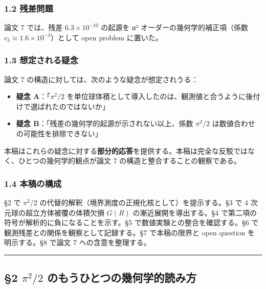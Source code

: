 \documentclass[
]{article}
\providecommand{\tightlist}{%
  \setlength{\itemsep}{0pt}\setlength{\parskip}{0pt}}
\begin{document}
\subsubsection{1.2 残差問題}\label{ux6b8bux5deeux554fux984c}

論文 7 では、残差 \(6.3 \times 10^{-10}\) の起源を α³
オーダーの幾何学的補正項（係数
\(c_3 \approx 1.6 \times 10^{-3}\)）として open problem に置いた。

\subsubsection{1.3
想定される疑念}\label{ux60f3ux5b9aux3055ux308cux308bux7591ux5ff5}

論文 7 の構造に対しては、次のような疑念が想定されうる：

\begin{itemize}
\tightlist
\item
  \textbf{疑念 A}：「\(\pi^2/2\)
  を単位球体積として導入したのは、観測値と合うように後付けで選ばれたのではないか」
\item
  \textbf{疑念 B}：「残差の幾何学的起源が示されない以上、係数
  \(\pi^2/2\) は数値合わせの可能性を排除できない」
\end{itemize}

本稿はこれらの疑念に対する\textbf{部分的応答}を提供する。本稿は完全な反駁ではなく、ひとつの幾何学的観点が論文
7 の構造と整合することの観察である。

\subsubsection{1.4 本稿の構成}\label{ux672cux7a3fux306eux69cbux6210}

§2 で \(\pi^2/2\) の代替的解釈（境界測度の正規化核として）を提示する。§3
で 4 次元球の超立方体被覆の体積欠損 \(G(R)\) の漸近展開を導出する。§4
で第二項の符号が解析的に負になることを示す。§5
で数値実験との整合を確認する。§6
で観測残差との関係を観察として記録する。§7 で本稿の限界と open question
を明示する。§8 で論文 7 への含意を整理する。

\begin{center}\rule{0.5\linewidth}{0.5pt}\end{center}

\subsection{\texorpdfstring{§2 \(\pi^2/2\)
のもうひとつの幾何学的読み方}{§2 \textbackslash pi\^{}2/2 のもうひとつの幾何学的読み方}}\label{pi22-ux306eux3082ux3046ux3072ux3068ux3064ux306eux5e7eux4f55ux5b66ux7684ux8aadux307fux65b9}
\end{document}
